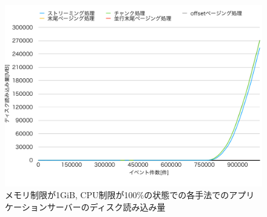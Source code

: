 \documentclass[../../../main]{subfiles}
\begin{document}
    \begin{figure}[H]
        \centering
        \includegraphics[width=12cm]{graph}
        \caption{メモリ制限が1GiB, CPU制限が100\%の状態での各手法でのアプリケーションサーバーのディスク読み込み量}
        \label{fig:app-disk-out}
    \end{figure}
\end{document}
